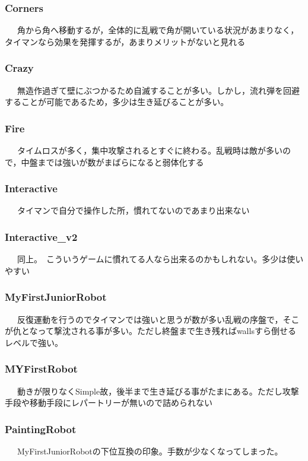 \documentclass[12pt]{jarticle} %
\begin{document}
\begin{flushleft}
  \subsubsection{Corners}
 \ \ \ 角から角へ移動するが，全体的に乱戦で角が開いている状況があまりなく，タイマンなら効果を発揮するが，あまりメリットがないと見れる

 \subsubsection{Crazy}
 \ \ \ 無造作過ぎて壁にぶつかるため自滅することが多い。しかし，流れ弾を回避することが可能であるため，多少は生き延びることが多い。
 
 
 \subsubsection{Fire}
 \ \ \ タイムロスが多く，集中攻撃されるとすぐに終わる。乱戦時は敵が多いので，中盤までは強いが数がまばらになると弱体化する
 
 \subsubsection{Interactive}
 \ \ \ タイマンで自分で操作した所，慣れてないのであまり出来ない
 
 \subsubsection{Interactive\_v2}
 \ \ \ 同上。　こういうゲームに慣れてる人なら出来るのかもしれない。多少は使いやすい
 
 \subsubsection{MyFirstJuniorRobot}
 \ \ \ 反復運動を行うのでタイマンでは強いと思うが数が多い乱戦の序盤で，そこが仇となって撃沈される事が多い。ただし終盤まで生き残ればwallsすら倒せるレベルで強い。
 
 \subsubsection{MYFirstRobot}
 \ \ \ 動きが限りなくSimple故，後半まで生き延びる事がたまにある。ただし攻撃手段や移動手段にレパートリーが無いので詰められない
 
 \subsubsection{PaintingRobot}
 \ \ \ MyFirstJuniorRobotの下位互換の印象。手数が少なくなってしまった。
 

\end{flushleft}
\end{document}
